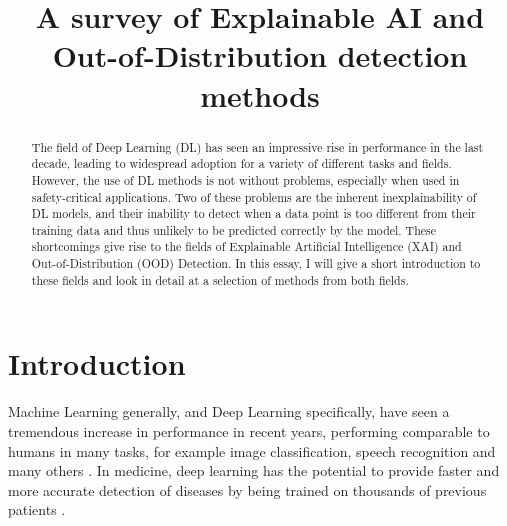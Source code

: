 \documentclass[conference]{IEEEtran}
\begin{document}
\title{A survey of Explainable AI and Out-of-Distribution detection methods}
\thispagestyle{plain}
\pagestyle{plain}

\author{
}

\maketitle




\begin{abstract}


The field of Deep Learning (DL) has seen an impressive rise in performance in the last decade, leading to widespread adoption for a variety of different tasks and fields. However, the use of DL methods is not without problems, especially when used in safety-critical applications. Two of these problems are the inherent inexplainability of DL models, and their inability to detect when a data point is too different from their training data and thus unlikely to be predicted correctly by the model. These shortcomings give rise to the fields of Explainable Artificial Intelligence (XAI) and Out-of-Distribution (OOD) Detection. In this essay, I will give a short introduction to these fields and look in detail at a selection of methods from both fields.

\end{abstract}

\section{Introduction}

Machine Learning generally, and Deep Learning specifically, have seen a tremendous increase in performance in recent years, performing comparable to humans in many tasks, for example image classification, speech recognition and many others \cite{performance}. In medicine, deep learning has the potential to provide faster and more accurate detection of diseases by being trained on thousands of previous patients \cite{xaisurvey}.
\end{document}
